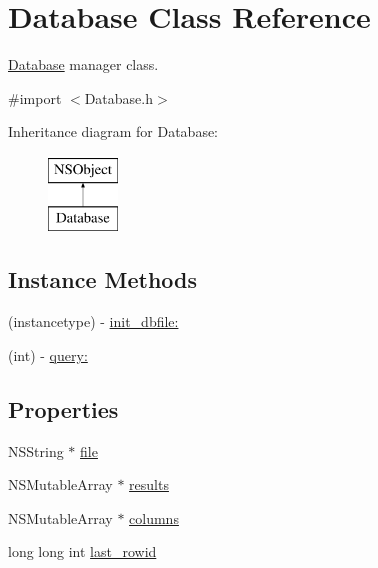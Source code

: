 \hypertarget{interfaceDatabase}{\section{Database Class Reference}
\label{interfaceDatabase}
}


\hyperlink{interfaceDatabase}{Database} manager class.  




{\ttfamily \#import $<$Database.\-h$>$}

Inheritance diagram for Database\-:\begin{figure}[H]
\begin{center}
\leavevmode
\includegraphics[height=2.000000cm]{interfaceDatabase}
\end{center}
\end{figure}
\subsection*{Instance Methods}
\begin{DoxyCompactItemize}
\item 
(instancetype) -\/ \hyperlink{interfaceDatabase_a631bb1f508de7a8397e51319c7d81100}{init\-\_\-dbfile\-:}
\item 
(int) -\/ \hyperlink{interfaceDatabase_a5cee36b8ec7d12bb7c43fc3c2581d848}{query\-:}
\end{DoxyCompactItemize}
\subsection*{Properties}
\begin{DoxyCompactItemize}
\item 
N\-S\-String $\ast$ \hyperlink{interfaceDatabase_a430fb12f30886311e10ce028918c11fa}{file}
\item 
N\-S\-Mutable\-Array $\ast$ \hyperlink{interfaceDatabase_aaf90264ccd741532c3b9258a82faa921}{results}
\item 
N\-S\-Mutable\-Array $\ast$ \hyperlink{interfaceDatabase_a1bd01161d2f5a26a74edccc2288b5774}{columns}
\item 
long long int \hyperlink{interfaceDatabase_ac733c637b2bf08cae3005686867338f9}{last\-\_\-rowid}
\end{DoxyCompactItemize}



